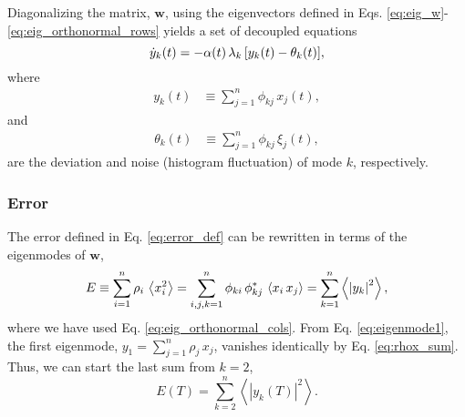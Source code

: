 \documentclass[reprint, superscriptaddress, floatfix]{revtex4-1}
\newcommand{\Err}{E}
\begin{document}
Diagonalizing the matrix, $\mathbf w$,
using the eigenvectors defined in Eqs.
\eqref{eq:eig_w}-\eqref{eq:eig_orthonormal_rows}
yields a set of decoupled equations
%
\begin{equation}
  \dot y_k(t)
  =
  -\alpha(t) \, \lambda_k \, [y_k(t) - \theta_k(t)],
  \notag
\end{equation}
%
where
\begin{align}
  y_k(t)
  &\equiv
  \sum_{j=1}^n
    \phi_{kj} \, x_j(t)
  ,
\end{align}
and
\begin{align}
  \theta_k(t)
  &\equiv
  \sum_{j=1}^n
    \phi_{kj} \, \xi_j(t)
  ,
  \label{eq:theta_def}
\end{align}
%
are the deviation and noise (histogram fluctuation)
of mode $k$, respectively.



\subsubsection{Error}



The error defined in Eq. \eqref{eq:error_def}
can be rewritten in terms of the eigenmodes of $\mathbf w$,
%
\begin{align}
  \Err
  \equiv
  \sum_{i = 1}^n \rho_i \,
    \left\langle x_i^2 \right\rangle
  =
  \sum_{i, j, k=1}^n \phi_{ki} \, \phi_{kj}^* \,
    \left\langle x_i \, x_j \right\rangle
  =
  \sum_{k = 1}^n
    \left\langle
      \left| y_k \right|^2
    \right\rangle
  ,
\notag
\end{align}
%
where we have used Eq. \eqref{eq:eig_orthonormal_cols}.
%
From Eq. \eqref{eq:eigenmode1},
the first eigenmode,
$y_1 = \sum_{j=1}^n \rho_j \, x_j$,
vanishes identically by Eq. \eqref{eq:rhox_sum}.
%
Thus, we can start the last sum %
from $k = 2$,
%
\begin{equation}
  \Err(T)
  =
  \sum_{k = 2}^n
    \left\langle
      \left| y_k(T) \right|^2
    \right\rangle
  .
\label{eq:y2_sum}
\end{equation}
\end{document}
